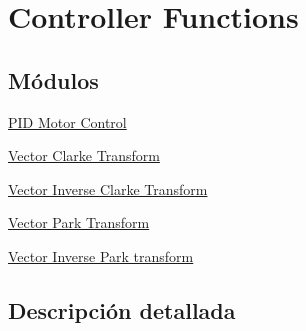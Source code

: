 \hypertarget{group__group_controller}{}\section{Controller Functions}
\label{group__group_controller}
\subsection*{Módulos}
\begin{DoxyCompactItemize}
\item 
\hyperlink{group___p_i_d}{P\+I\+D Motor Control}
\item 
\hyperlink{group__clarke}{Vector Clarke Transform}
\item 
\hyperlink{group__inv__clarke}{Vector Inverse Clarke Transform}
\item 
\hyperlink{group__park}{Vector Park Transform}
\item 
\hyperlink{group__inv__park}{Vector Inverse Park transform}
\end{DoxyCompactItemize}


\subsection{Descripción detallada}
